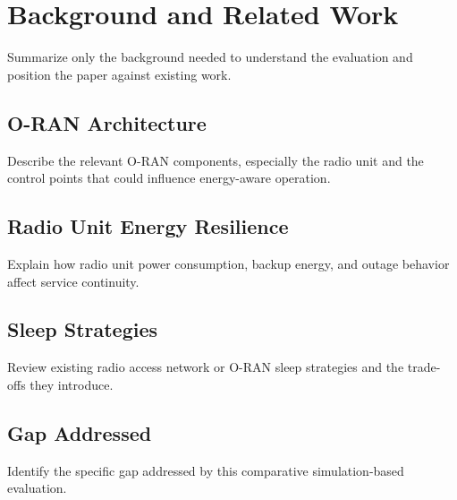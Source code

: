 \section{Background and Related Work}

Summarize only the background needed to understand the evaluation and position
the paper against existing work.

\subsection{O-RAN Architecture}
Describe the relevant O-RAN components, especially the radio unit and the
control points that could influence energy-aware operation.

\subsection{Radio Unit Energy Resilience}
Explain how radio unit power consumption, backup energy, and outage behavior
affect service continuity.

\subsection{Sleep Strategies}
Review existing radio access network or O-RAN sleep strategies and the
trade-offs they introduce.

\subsection{Gap Addressed}
Identify the specific gap addressed by this comparative simulation-based
evaluation.
